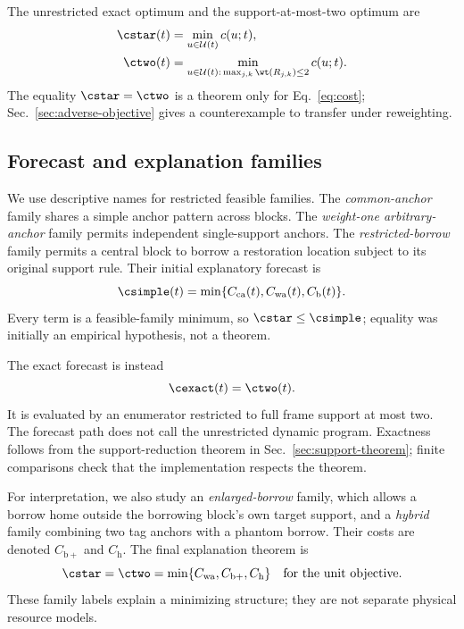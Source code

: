 The unrestricted exact optimum and the support-at-most-two optimum are
\begin{align}
\cstar(t)&=\min_{u\in\mathcal U(t)}c(u;t),\\
\ctwo(t)&=\min_{u\in\mathcal U(t):\,\max_{j,k}\wt(R_{j,k})\leq2}c(u;t).
\end{align}
The equality $\cstar=\ctwo$ is a theorem only for Eq.~\eqref{eq:cost}; Sec.~\ref{sec:adverse-objective} gives a counterexample to transfer under reweighting.

\subsection{Forecast and explanation families}
\label{sec:certificate}

We use descriptive names for restricted feasible families. The \emph{common-anchor} family shares a simple anchor pattern across blocks. The \emph{weight-one arbitrary-anchor} family permits independent single-support anchors. The \emph{restricted-borrow} family permits a central block to borrow a restoration location subject to its original support rule. Their initial explanatory forecast is
\begin{equation}
\csimple(t)=\min\{C_{\mathrm{ca}}(t),C_{\mathrm{wa}}(t),C_{\mathrm b}(t)\}.
\label{eq:simple}
\end{equation}
Every term is a feasible-family minimum, so $\cstar\leq\csimple$; equality was initially an empirical hypothesis, not a theorem.

The exact forecast is instead
\begin{equation}
\cexact(t)=\ctwo(t).
\label{eq:exact}
\end{equation}
It is evaluated by an enumerator restricted to full frame support at most two. The forecast path does not call the unrestricted dynamic program. Exactness follows from the support-reduction theorem in Sec.~\ref{sec:support-theorem}; finite comparisons check that the implementation respects the theorem.

For interpretation, we also study an \emph{enlarged-borrow} family, which allows a borrow home outside the borrowing block's own target support, and a \emph{hybrid} family combining two tag anchors with a phantom borrow. Their costs are denoted $C_{\mathrm{b+}}$ and $C_{\mathrm h}$. The final explanation theorem is
\begin{equation}
\cstar=\ctwo=\min\{C_{\mathrm{wa}},C_{\mathrm{b+}},C_{\mathrm h}\}
\quad\text{for the unit objective.}
\label{eq:classification}
\end{equation}
These family labels explain a minimizing structure; they are not separate physical resource models.

